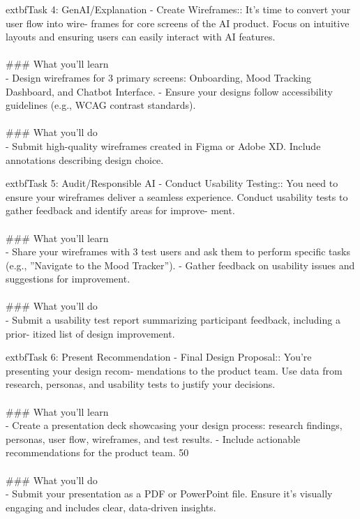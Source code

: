 \documentclass{article}
\begin{document}
	extbf{Task 4:} GenAI/Explanation - Create Wireframes:: It’s time to convert your user flow into wire- frames for core screens of the AI product. Focus on intuitive layouts and ensuring users can easily interact with AI features. \\
 \\
### What you'll learn \\
- Design wireframes for 3 primary screens: Onboarding, Mood Tracking Dashboard, and Chatbot Interface. - Ensure your designs follow accessibility guidelines (e.g., WCAG contrast standards). \\
 \\
### What you'll do \\
- Submit high-quality wireframes created in Figma or Adobe XD. Include annotations describing design choice.

	extbf{Task 5:} Audit/Responsible AI - Conduct Usability Testing:: You need to ensure your wireframes deliver a seamless experience. Conduct usability tests to gather feedback and identify areas for improve- ment. \\
 \\
### What you'll learn \\
- Share your wireframes with 3 test users and ask them to perform specific tasks (e.g., ”Navigate to the Mood Tracker”). - Gather feedback on usability issues and suggestions for improvement. \\
 \\
### What you'll do \\
- Submit a usability test report summarizing participant feedback, including a prior- itized list of design improvement.

	extbf{Task 6:} Present Recommendation - Final Design Proposal:: You’re presenting your design recom- mendations to the product team. Use data from research, personas, and usability tests to justify your decisions. \\
 \\
### What you'll learn \\
- Create a presentation deck showcasing your design process: research findings, personas, user flow, wireframes, and test results. - Include actionable recommendations for the product team. 50 \\
 \\
### What you'll do \\
- Submit your presentation as a PDF or PowerPoint file. Ensure it’s visually engaging and includes clear, data-driven insights.
\end{document}
